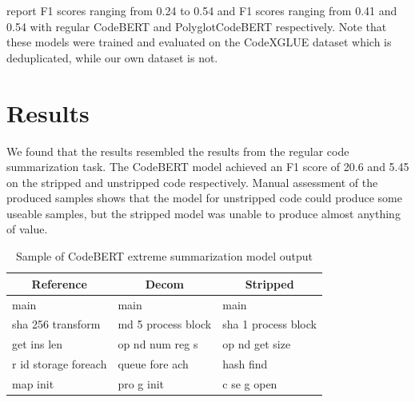 \citeauthor{PolyglotCodeBERT} report F1 scores ranging from 0.24 to 0.54 and F1 scores ranging from 0.41 and 0.54 with regular CodeBERT and PolyglotCodeBERT respectively. Note that these models were trained and evaluated on the CodeXGLUE \cite{CodeXGlue} dataset which is deduplicated, while our own dataset is not. %

\section{Results}
We found that the results resembled the results from the regular code summarization task. The CodeBERT model achieved an F1 score of 20.6 and 5.45 on the stripped and unstripped code respectively. Manual assessment of the produced samples shows that the model for unstripped code could produce some useable samples, but the stripped model was unable to produce almost anything of value.

\begin{table}[h]
\begin{tabular}{l|ll}
\multicolumn{1}{c|}{Reference} & \multicolumn{1}{c}{Decom} & \multicolumn{1}{c}{Stripped} \\ \hline
main                           & main                      & main                         \\
sha 256 transform              & md 5  process  block      & sha 1  process  block        \\
get ins len                    & op nd  num  reg s         & op nd  get  size             \\
r id storage foreach           & queue  fore ach           & hash  find                   \\
map init                       & pro g  init               & c se g  open                
\end{tabular}
\caption{Sample of CodeBERT extreme summarization model output}
\end{table}


